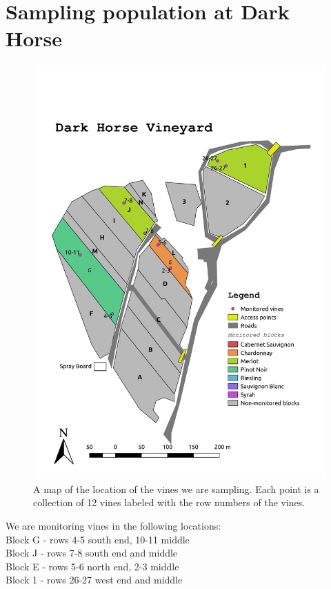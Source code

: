 \documentclass[11pt,letter]{article}
\begin{document}
\section{Sampling population at Dark Horse}
\begin{figure}%
  \includegraphics[width=0.9\linewidth]{DH_map.jpg}
  \caption{A map of the location of the vines we are sampling. Each point is a collection of 12 vines labeled with the row numbers of the vines.}
  \label{fig:DH_map}
\end{figure}

We are monitoring vines in the following locations: \\
Block G - rows 4-5 south end, 10-11 middle \\
Block J - rows 7-8 south end and middle \\
Block E - rows 5-6 north end, 2-3 middle \\
Block 1 - rows 26-27 west end and middle \\
\end{document}
